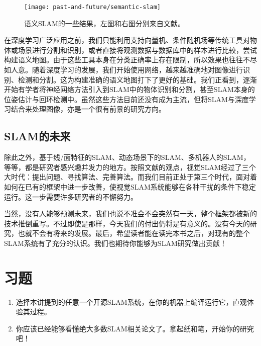\begin{figure}[!thp]
	\centering
	\texttt{[image: past-and-future/semantic-slam]}
	\caption{语义SLAM的一些结果，左图和右图分别来自文献\cite{Anand2012, Salas-Moreno2014}。}
	\label{fig:semantic-slam}
\end{figure}

在深度学习广泛应用之前，我们只能利用支持向量机、条件随机场等传统工具对物体或场景进行分割和识别，或者直接将观测数据与数据库中的样本进行比较\textsuperscript{\cite{Salas-Moreno2013, Salas-Moreno2014}}，尝试构建语义地图\textsuperscript{\cite{Anand2012, Stueckler2012, Kostavelis2013, Couprie2013}}。由于这些工具本身在分类正确率上存在限制，所以效果也往往不尽如人意。随着深度学习的发展，我们开始使用网络，越来越准确地对图像进行识别、检测和分割\textsuperscript{\cite{Deng2009, Krizhevsky2012, He2015, Ren2015, Long2014, Zheng2015}}。这为构建准确的语义地图打下了更好的基础\textsuperscript{\cite{Gupta2014}}。我们正看到，逐渐开始有学者将神经网络方法引入到SLAM中的物体识别和分割，甚至SLAM本身的位姿估计与回环检测中\textsuperscript{\cite{Konda2015, Kendall2015, Hou2015}}。虽然这些方法目前还没有成为主流，但将SLAM与深度学习结合来处理图像，亦是一个很有前景的研究方向。

\subsection{SLAM的未来}
除此之外，基于线/面特征的SLAM\textsuperscript{\cite{An2012, Zhou2015, Benedettelli2012}}、动态场景下的SLAM\textsuperscript{\cite{Saarinen2013, Maddern2012,  Wang2008}}、多机器人的SLAM\textsuperscript{\cite{Zou2013, Gil2010a, Vidal-Calleja2011}}，等等，都是研究者感兴趣并发力的地方。按照文献\cite{Cadena2016}的观点，视觉SLAM经过了三个大时代：提出问题、寻找算法、完善算法。而我们目前正处于第三个时代，面对着如何在已有的框架中进一步改善，使视觉SLAM系统能够在各种干扰的条件下稳定运行。这一步需要许多研究者的不懈努力。

当然，没有人能够预测未来，我们也说不准会不会突然有一天，整个框架都被新的技术推倒重写。不过即使是那样，今天我们的付出仍将是有意义的。没有今天的研究，也就不会有将来的发展。最后，希望读者能在读完本书之后，对现有的整个SLAM系统有了充分的认识。我们也期待你能够为SLAM研究做出贡献！

\section*{习题}
\begin{enumerate}
	\item 选择本讲提到的任意一个开源SLAM系统，在你的机器上编译运行它，直观体验其过程。
	\item 你应该已经能够看懂绝大多数SLAM相关论文了。拿起纸和笔，开始你的研究吧！
\end{enumerate}

